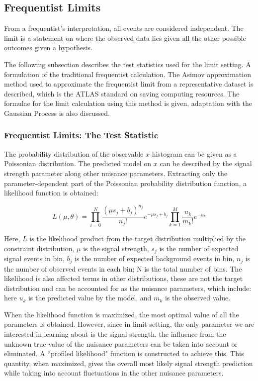 \subsection{Frequentist Limits}
\label{sec:freq}
From a frequentist's interpretation, all events are considered independent. The limit is a statement on where the observed data lies given all the other possible outcomes given a hypothesis. 

The following subsection describes the test statistics used for the limit setting. A formulation of the traditional frequentist calculation. The Asimov approximation method used to approximate the frequentist limit from a representative dataset is described, which is the ATLAS standard on saving computing resources. The formulae for the limit calculation using this method is given, adaptation with the Gaussian Process is also discussed. 

\subsubsection{Frequentist Limits: The Test Statistic}
\label{sec:freqTestStats}

The probability distribution of the observable $x$ histogram can be given as a Poissonian distribution. The predicted model on $x$ can be described by the signal strength parameter along other nuisance parameters. Extracting only the parameter-dependent part of the Poissonian probability distribution function, a likelihood function is obtained:

\begin{equation}
    L(\mu, \theta) =  \prod_{i=0}^{N} \frac{(\mu s_{j} + b_{j})^{n_j}}{n_{j}!}e^{-\mu s_j + b_j} \prod_{k=1}^{M}\frac{u_{k}}
{m_{k}!} e^{-u_{k}}
\label{eq:likelihood}
\end{equation}

Here, $L$ is the likelihood product from the target distribution multiplied by the constraint distribution, $\mu$ is the signal strength, $s_j$ is the number of expected signal events in bin, $b_j$ is the number of expected background events in bin, $n_j$ is the number of observed events in each bin; N is the total number of bins. The likelihood is also affected terms in other distributions, these
are not the target distribution and can be accounted for as the nuisance parameters, which
include: here $u_k$ is the predicted value by the model, and $m_{k}$ is the observed value. 

When the likelihood function is maximized, the most optimal value of all the parameters is obtained. However, since in limit setting, the only parameter we are interested in learning about is the signal strength, the influence from the unknown true value of the nuisance parameters can be taken into account or eliminated. A ``profiled likelihood" function is constructed to achieve this. This quantity, when maximized, gives the overall most likely signal strength prediction while taking into account fluctuations in the other nuisance parameters. 

